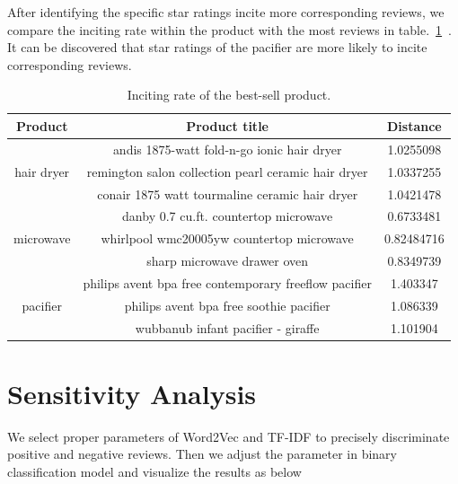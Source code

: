 \documentclass[12pt]{article}%
\begin{document}
After identifying the specific star ratings incite more corresponding reviews, we compare the inciting rate within the product with the most reviews in table.~\ref{biasssso}~. It can be discovered that star ratings of the pacifier are more likely to incite corresponding reviews.
\begin{table}[H]
	\centering
	\caption{Inciting rate of the best-sell product.}	
	\begin{tabular}{c|cc}
		\toprule[1.5pt]
		\multicolumn{1}{m{2cm}}{\centering Product} &
		\multicolumn{1}{m{9cm}}{\centering Product title} & \multicolumn{1}{m{2cm}}{\centering Distance}\\
		\midrule[1pt]
		&andis 1875-watt fold-n-go ionic hair dryer &1.0255098\\
		hair dryer&remington salon collection pearl ceramic hair dryer     & 1.0337255\\
		&conair 1875 watt tourmaline ceramic hair dryer          &1.0421478\\
		\midrule[1pt]
		&danby 0.7 cu.ft. countertop microwave          & 0.6733481\\
		microwave&whirlpool wmc20005yw  countertop microwave          &0.82484716\\
		&sharp microwave drawer oven        &0.8349739\\
				\midrule[1pt]
		&philips avent bpa free contemporary freeflow pacifier        &1.403347\\
		pacifier&philips avent bpa free soothie pacifier       &1.086339\\
		&wubbanub infant pacifier - giraffe&1.101904\\
		\bottomrule[1.6pt]
	\end{tabular}\label{biasssso}
\end{table}


\section{Sensitivity Analysis}

We select proper parameters of Word2Vec and TF-IDF to precisely discriminate positive and negative reviews. Then we adjust the parameter in binary classification model and visualize the results as below
\end{document}
